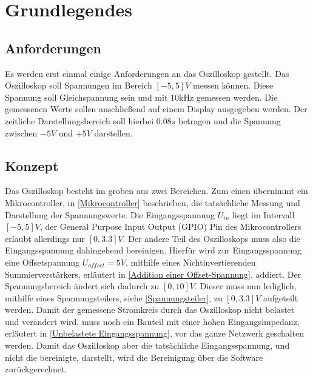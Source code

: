 \section{Grundlegendes}
\label{Grundlegendes}

\subsection{Anforderungen}
\label{Anforderungen}
Es werden erst einmal einige Anforderungen an das Oszilloskop gestellt. \newline
Das Oszilloskop soll Spannungen im Bereich $[-5, 5]V$ messen können.
Diese Spannung soll Gleichspannung sein und mit $10\si{\kilo\hertz}$ gemessen werden. \newline
Die gemessenen Werte sollen anschließend auf einem Display ausgegeben werden.
Der zeitliche Darstellungsbereich soll hierbei $0.08s$ betragen und die Spannung
zwischen $-5V$ und $+5V$ darstellen.



\subsection{Konzept}
Das Oszilloskop besteht im groben aus zwei Bereichen.
Zum einen übernimmt ein Mikrocontroller, in \ref{Mikrocontroller} beschrieben,
die tatsächliche Messung und Darstellung der Spannungswerte.
Die Eingangsspannung $U_{in}$ liegt im Intervall $[-5, 5] V$,
der General Purpose Input Output (GPIO) Pin des Mikrocontrollers erlaubt allerdings nur $[0, 3.3] V$.
Der andere Teil des Oszilloskops muss also die Eingangsspannung dahingehend bereinigen.
\newline \newline
Hierfür wird zur Eingangsspannung eine Offsetspannung $U_{offset} = 5V$,
mithilfe eines Nichtinvertierenden Summierverstärkers,
erläutert in \ref{Addition einer Offset-Spannung}, addiert. \newline
Der Spannungsbereich ändert sich dadurch zu $[0, 10] V$.
Dieser muss nun lediglich, mithilfe eines Spannungsteilers, siehe \ref{Spannungsteiler},
zu $[0, 3.3] V$ aufgeteilt werden.
Damit der gemessene Stromkreis durch das Oszilloskop nicht belastet und verändert wird,
muss noch ein Bauteil mit einer hohen Eingangsimpedanz, erläutert in \ref{Unbelastete Eingangsspannung},
vor das ganze Netzwerk geschalten werden.
Damit das Oszilloskop aber die tatsächliche Eingangsspannung, und nicht die bereinigte, darstellt,
wird die Bereinigung über die Software zurückgerechnet.


